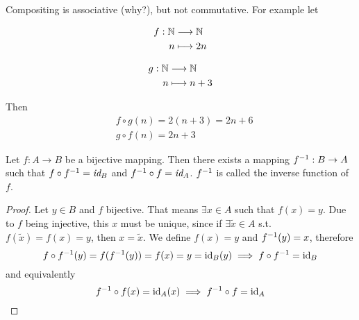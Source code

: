 \documentclass[../../script.tex]{subfiles}
\begin{document}
\begin{rem}
Compositing is associative (why?), but not commutative. For example let

\noindent\begin{minipage}{.5\linewidth}
	\begin{align*}
		f: \mathbb{N} &\longrightarrow \mathbb{N} \\
		n &\longmapsto 2n
	\end{align*}
\end{minipage}
\begin{minipage}{.5\linewidth}
	\begin{align*}
		g: \mathbb{N} &\longrightarrow \mathbb{N} \\
		n &\longmapsto n + 3
	\end{align*}
\end{minipage}
Then
\begin{align*}
	&f \circ g (n) = 2(n + 3) = 2n + 6 \\
	&g \circ f (n) = 2n + 3
\end{align*}
\end{rem}

\begin{thm}
Let $f: A \rightarrow B$ be a bijective mapping. Then there exists a mapping ${f}^{-1}: B \rightarrow A$ such that $f \circ {f}^{-1} = \emph{\text{id}}_B$ and ${f}^{-1} \circ f = \emph{\text{id}}_A$. ${f}^{-1}$ is called the inverse function of $f$.
\end{thm}
\begin{proof}
Let $y \in B$ and $f$ bijective. That means $\exists x \in A$ such that $f(x) = y$. Due to $f$ being injective, this $x$ must be unique, since if $\exists \tilde{x} \in A$ s.t. $f(\tilde{x}) = f(x) = y$, then $x = \tilde{x}$. We define $f(x) = y$ and ${f}^{-1}(y) = x$, therefore
\begin{equation}
	f \circ {f}^{-1}(y) = f({f}^{-1}(y)) = f(x) = y = \text{id}_B(y) \implies f \circ {f}^{-1} = \text{id}_B
\end{equation}
and equivalently
\begin{equation}
	{f}^{-1} \circ f(x) = \text{id}_A(x) \implies {f}^{-1} \circ f = \text{id}_A
\end{equation}
\end{proof}
\end{document}
